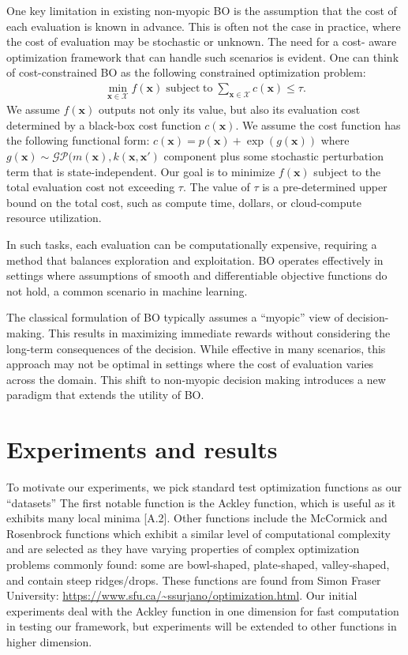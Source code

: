 \documentclass{article}
\newcommand{\bfx}{\textbf{x}}
\begin{document}
One key limitation in existing non-myopic BO is the 
assumption that the cost of each evaluation is known in advance. 
This is often not the case in practice, where the cost of 
evaluation may be stochastic or unknown. The need for a cost-
aware optimization framework that can handle such scenarios is 
evident. One can think of cost-constrained BO as the following constrained optimization problem:
\begin{align*}
\min_{\bfx \in \mathcal{X}} f(\bfx)
\operatorname{subject \; to} \sum_{\bfx \in \mathcal{X}} c(\bfx)
\leq \tau.
\end{align*}
We assume $f(\bfx)$ outputs not only its value, but also its evaluation cost determined by a 
black-box cost function $c(\bfx)$. We assume the cost function has the following functional
form: $c(\bfx) = p(\bfx) + \exp(g(\bfx))$ where $g(\bfx) \sim \mathcal{GP}(m(\bfx), k(\bfx, \bfx')$
component plus some stochastic perturbation term that is state-independent. Our goal is to
minimize $f(\bfx)$ subject to the total evaluation cost not exceeding $\tau$. The value of
$\tau$ is a pre-determined upper bound on the total cost, such as compute time, dollars, or
cloud-compute resource utilization.


In such tasks, each evaluation can be 
computationally expensive, requiring a method that balances 
exploration and exploitation. BO operates effectively in 
settings where assumptions of smooth and differentiable 
objective functions do not hold, a common scenario in machine 
learning.

The classical formulation of BO typically assumes a ``myopic'' 
view of decision-making. This results in maximizing immediate 
rewards without considering the long-term consequences of the 
decision. While effective in many scenarios, this approach may 
not be optimal in settings where the cost of evaluation varies 
across the domain. This shift to non-myopic decision making 
introduces a new paradigm that extends the utility of BO.

\section{Experiments and results}

To motivate our experiments, we pick standard test optimization functions as our ``datasets'' The first notable function is the Ackley function, which is useful as it exhibits many local minima [A.2]. Other functions include the McCormick and Rosenbrock functions which exhibit a similar level of computational complexity and are selected as they have varying properties of complex optimization problems commonly found: some are bowl-shaped, plate-shaped, valley-shaped, and contain steep ridges/drops. These functions are found from Simon Fraser University: \url{https://www.sfu.ca/~ssurjano/optimization.html}. Our initial experiments deal with the Ackley function in one dimension for fast computation in testing our framework, but experiments will be extended to other functions in higher dimension.
\end{document}
